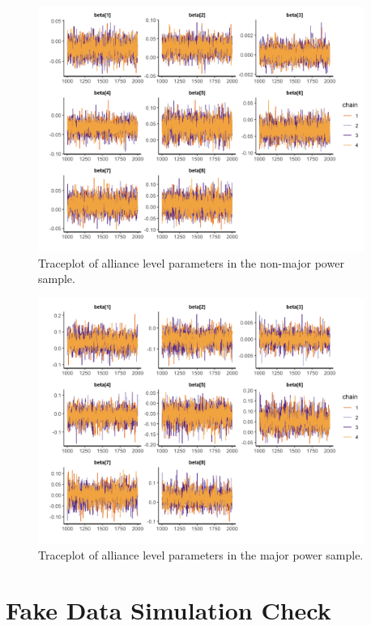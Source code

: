 \documentclass[12pt]{article}
\begin{document}
\begin{figure}[htbp]
	\centering
		\includegraphics[width=0.95\textwidth]{trace-all-min.png}
	\caption{Traceplot of alliance level parameters in the non-major power sample.}
	\label{fig:trace-all-min}
\end{figure}


\begin{figure}[htbp]
	\centering
		\includegraphics[width=0.95\textwidth]{trace-all-maj.png}
	\caption{Traceplot of alliance level parameters in the major power sample.}
	\label{fig:trace-all-maj}
\end{figure}


\section{Fake Data Simulation Check}
\end{document}
